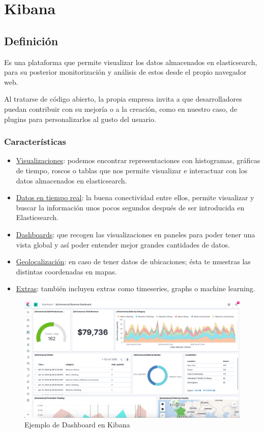 \documentclass[a4paper, 12pt]{book}
\begin{document}
\section{Kibana}
\label{sec:Kibana}
\subsection{Definición}
Es una plataforma que permite visualizar los datos almacenados en elasticsearch, para su posterior monitorización y análisis de estos desde el propio navegador web\cite{srivastaba:_kibanaguide}.

Al tratarse de código abierto, la propia empresa invita a que desarrolladores puedan contribuir con su mejoría o a la creación, como en nuestro caso, de plugins para personalizarlos al gusto del usuario. 
\subsubsection{Características}
\begin{itemize}
\item \underline{Visualizaciones}: podemos encontrar representaciones con histogramas, gráficas de tiempo, roscos o tablas que nos permite visualizar e interactuar con los datos almacenados en elasticsearch.
\item \underline{Datos en tiempo real}: la buena conectividad entre ellos, permite visualizar y buscar la información unos pocos segundos después de ser introducida en Elasticsearch.
\item \underline{Dashboards}: que recogen las visualizaciones en paneles para poder tener una vista global y así poder entender mejor grandes cantidades de datos.
\item \underline{Geolocalización}: en caso de tener datos de ubicaciones; ésta te muestras las distintas coordenadas en mapas.
\item \underline{Extras}: también incluyen extras como timeseries, graphs o machine learning.
\end{itemize}

\begin{figure}[H]
  \centering
  \includegraphics[width=12cm, keepaspectratio]{img/development/kibana-dashboard.png}
  \caption{Ejemplo de Dashboard en Kibana}
  \label{fig:kibanaexample}
\end{figure}
\end{document}
